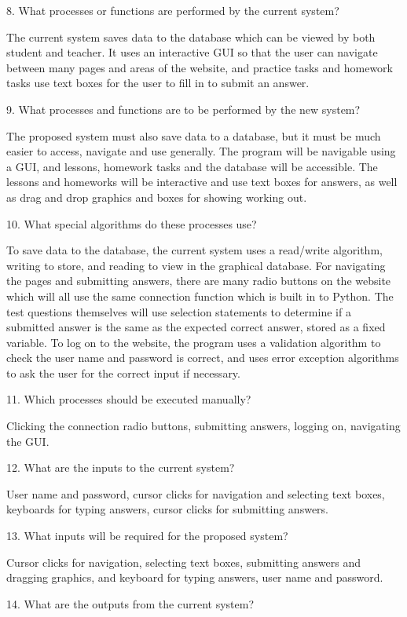 8. What processes or functions are performed by the current system?

The current system saves data to the database which can be viewed by both student and teacher. It uses an interactive GUI so that the user can navigate between many pages and areas of the website, and practice tasks and homework tasks use text boxes for the user to fill in to submit an answer.

9. What processes and functions are to be performed by the new system?

The proposed system must also save data to a database, but it must be much easier to access, navigate and use generally. The program will be navigable using a GUI, and lessons, homework tasks and the database will be accessible. The lessons and homeworks will be interactive and use text boxes for answers, as well as drag and drop graphics and boxes for showing working out.

10. What special algorithms do these processes use?

To save data to the database, the current system uses a read/write algorithm, writing to store, and reading to view in the graphical database. For navigating the pages and submitting answers, there are many radio buttons on the website which will all use the same connection function which is built in to Python. The test questions themselves will use selection statements to determine if a submitted answer is the same as the expected correct answer, stored as a fixed variable. To log on to the website, the program uses a validation algorithm to check the user name and password is correct, and uses error exception algorithms to ask the user for the correct input if necessary.

11. Which processes should be executed manually?

Clicking the connection radio buttons, submitting answers, logging on, navigating the GUI.

12. What are the inputs to the current system?

User name and password, cursor clicks for navigation and selecting text boxes, keyboards for typing answers, cursor clicks for submitting answers.

13. What inputs will be required for the proposed system?

Cursor clicks for navigation, selecting text boxes, submitting answers and dragging graphics, and keyboard for typing answers, user name and password.

14. What are the outputs from the current system?

